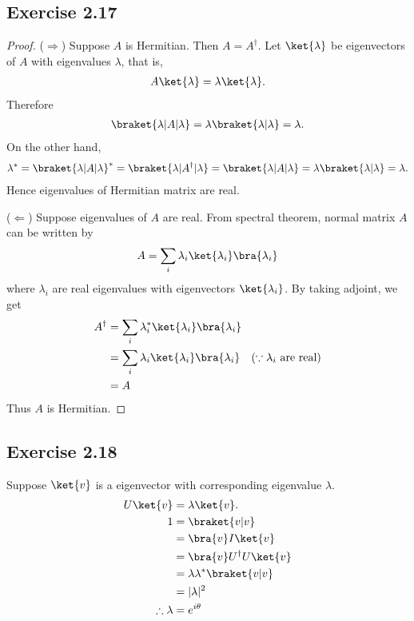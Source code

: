 \documentclass[a4paper,12pt]{article}
\begin{document}
\subsection*{Exercise 2.17}
\begin{proof}
	($\Rightarrow$) Suppose $A$ is Hermitian. Then $A=A^\dagger$.
	Let $\ket{\lambda}$ be eigenvectors of $A$ with eigenvalues $\lambda$, that is,
	\begin{align*}
		A \ket{\lambda} = \lambda \ket{\lambda}.
	\end{align*}
	Therefore
	\begin{align*}
		\braket{\lambda | A | \lambda} = \lambda \braket{\lambda | \lambda} = \lambda.
	\end{align*}
	On the other hand,
	\begin{align*}
		\lambda^*  = \braket{\lambda | A | \lambda}^*
								= \braket{\lambda | A^\dagger |  \lambda}
								= \braket{\lambda | A | \lambda}
								= \lambda \braket{\lambda | \lambda} = \lambda.
	\end{align*}
	Hence eigenvalues of Hermitian matrix are real.

	($\Leftarrow$) Suppose eigenvalues of $A$ are real. From spectral theorem, normal matrix $A$ can be written by
		$$A= \sum_i \lambda_i \ket{\lambda_i}\bra{\lambda_i}$$
	where $\lambda_i$ are  real eigenvalues with eigenvectors $\ket{\lambda_i}$.
	By taking adjoint, we get
	\begin{align*}
		A^\dagger &= \sum_i \lambda_i^* \ket{\lambda_i}\bra{\lambda_i}\\
								&= \sum_i \lambda_i \ket{\lambda_i}\bra{\lambda_i}~~~(\because \lambda_i \text{ are real})\\
								&= A
	\end{align*}
	Thus $A$ is Hermitian.
\end{proof}

\subsection*{Exercise 2.18}
Suppose $\ket{v}$ is a eigenvector with corresponding eigenvalue $\lambda$.
\begin{align*}
	U \ket{v} &= \lambda \ket{v}.\\
	1 &= \braket{v | v}\\
	&= \bra{v} I \ket{v}\\
	&= \bra{v} U^\dagger U \ket{v}\\
	&= \lambda \lambda^* \braket{v | v}\\
	&= |\lambda|^2\\
	\therefore \lambda &= e^{i \theta}
\end{align*}
\end{document}
